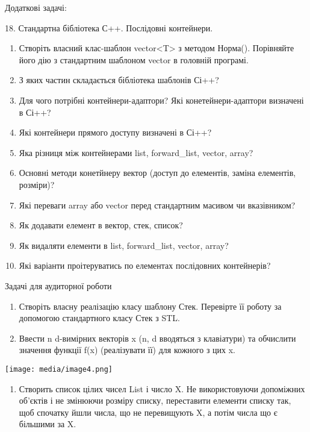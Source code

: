 \documentclass[]{article}
\begin{document}
Додаткові задачі:

18. Стандартна бібліотека С++. Послідовні контейнери.

\begin{enumerate}
\def\labelenumi{\arabic{enumi})}
\item
  Створіть власний клас-шаблон vector\textless{}T\textgreater{} з
  методом Норма(). Порівняйте його дію з стандартним шаблоном vector в
  головній програмі.
\item
  З яких частин складається бібліотека шаблонів Сі++?
\item
  Для чого потрібні контейнери-адаптори? Які конетейнери-адаптори
  визначені в Сі++?
\item
  Які контейнери прямого доступу визначені в Сі++?
\item
  Яка різниця між контейнерами list, forward\_list, vector, array?
\item
  Основні методи конетйнеру вектор (доступ до елементів, заміна
  елементів, розміри)?
\item
  Які переваги array або vector перед стандартним масивом чи
  вказівником?
\item
  Як додавати елемент в вектор, стек, список?
\item
  Як видаляти елементи в list, forward\_list, vector, array?
\item
  Які варіанти проітеруватись по елементах послідовних контейнерів?
\end{enumerate}

Задачі для аудиторної роботи

\begin{enumerate}
\def\labelenumi{\arabic{enumi})}
\item
  Створіть власну реалізацію класу шаблону Стек. Перевірте її роботу за
  допомогою стандартного класу Стек з STL.
\item
  Ввести n d-вимірних векторів x (n, d вводяться з клавіатури) та
  обчислити значення функції f(x) (реалізувати її) для кожного з цих x.
\end{enumerate}

\texttt{[image: media/image4.png]}

\begin{enumerate}
\def\labelenumi{\arabic{enumi})}
\item
  Створить список цілих чисел List і число X. Не використовуючи
  допоміжних об'єктів і не змінюючи розміру списку, переставити елементи
  списку так, щоб спочатку йшли числа, що не перевищують X, а потім
  числа що є більшими за X.
\end{enumerate}
\end{document}
